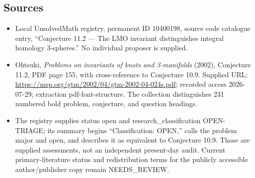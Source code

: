 \documentclass[11pt]{article}
\begin{document}
\subsection{Sources}
\begin{itemize}
\item Local UnsolvedMath registry, permanent ID 10400198, source code catalogue entry, ``Conjecture 11.2 --- The LMO invariant distinguishes integral homology 3-spheres.'' No individual proposer is supplied.
\item Ohtsuki, \emph{Problems on invariants of knots and 3-manifolds} (2002), Conjecture 11.2, PDF page 155, with cross-reference to Conjecture 10.9. Supplied URL: \url{https://msp.org/gtm/2002/04/gtm-2002-04-024s.pdf}; recorded access 2026-07-29; extraction pdf-font-structure. The collection distinguishes 231 numbered bold problem, conjecture, and question headings.
\item The registry supplies status open and research\_classification OPEN-TRIAGE; its summary begins ``Classification: OPEN,'' calls the problem major and open, and describes it as equivalent to Conjecture 10.9. Those are supplied assessments, not an independent present-day audit. Current primary-literature status and redistribution terms for the publicly accessible author/publisher copy remain NEEDS\_REVIEW.
\end{itemize}
\end{document}
